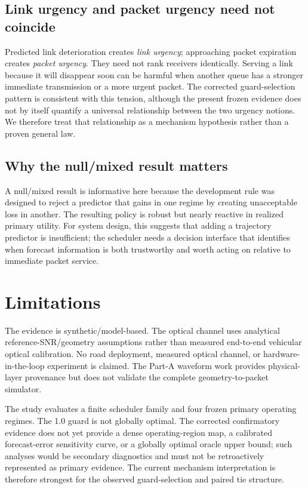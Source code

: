\documentclass[conference]{IEEEtran}
\begin{document}
\subsection{Link urgency and packet urgency need not coincide}
Predicted link deterioration creates \emph{link urgency}; approaching packet expiration creates \emph{packet urgency}. They need not rank receivers identically. Serving a link because it will disappear soon can be harmful when another queue has a stronger immediate transmission or a more urgent packet. The corrected guard-selection pattern is consistent with this tension, although the present frozen evidence does not by itself quantify a universal relationship between the two urgency notions. We therefore treat that relationship as a mechanism hypothesis rather than a proven general law.

\subsection{Why the null/mixed result matters}
A null/mixed result is informative here because the development rule was designed to reject a predictor that gains in one regime by creating unacceptable loss in another. The resulting policy is robust but nearly reactive in realized primary utility. For system design, this suggests that adding a trajectory predictor is insufficient; the scheduler needs a decision interface that identifies when forecast information is both trustworthy and worth acting on relative to immediate packet service.

\section{Limitations}
The evidence is synthetic/model-based. The optical channel uses analytical reference-SNR/geometry assumptions rather than measured end-to-end vehicular optical calibration. No road deployment, measured optical channel, or hardware-in-the-loop experiment is claimed. The Part-A waveform work provides physical-layer provenance but does not validate the complete geometry-to-packet simulator.

The study evaluates a finite scheduler family and four frozen primary operating regimes. The 1.0 guard is not globally optimal. The corrected confirmatory evidence does not yet provide a dense operating-region map, a calibrated forecast-error sensitivity curve, or a globally optimal oracle upper bound; such analyses would be secondary diagnostics and must not be retroactively represented as primary evidence. The current mechanism interpretation is therefore strongest for the observed guard-selection and paired tie structure.
\end{document}
